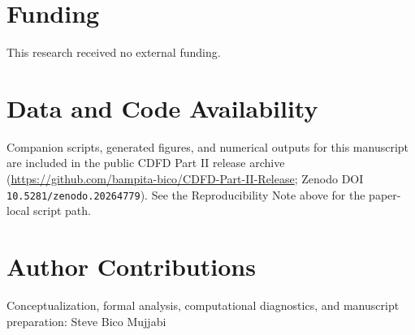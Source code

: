 \documentclass[11pt,a4paper]{article}
\begin{document}
\section*{Funding}
This research received no external funding.

\section*{Data and Code Availability}
Companion scripts, generated figures, and numerical outputs for this manuscript are included in the public CDFD Part II release archive (\url{https://github.com/bampita-bico/CDFD-Part-II-Release}; Zenodo DOI \texttt{10.5281/zenodo.20264779}). See the Reproducibility Note above for the paper-local script path.

\section*{Author Contributions}
Conceptualization, formal analysis, computational diagnostics, and manuscript preparation: Steve Bico Mujjabi



\end{document}
